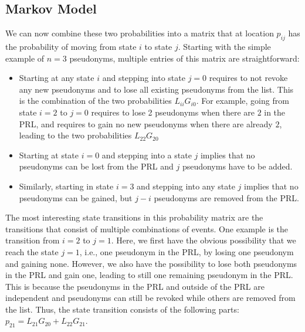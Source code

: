 \subsection{Markov Model}
We can now combine these two probabilities into a matrix that at location
$p_{ij}$ has the probability of moving from state $i$ to state $j$. Starting
with the simple example of $n=3$ pseudonyms, multiple entries of this matrix are
straightforward:
\begin{itemize}
    \item Starting at any state $i$ and stepping into state $j=0$ requires to not revoke any new pseudonyms and to lose all existing pseudonyms from the list. This is the combination of the two probabilities $L_{ii}G_{i0}$. For example, going from state $i=2$ to $j=0$ requires to lose 2 pseudonyms when there are $2$ in the \ac{PRL}, and requires to gain no new pseudonyms when there are already $2$, leading to the two probabilities $L_{22}G_{20}$
    \item Starting at state $i=0$ and stepping into a state $j$ implies that no pseudonyms can be lost from the \ac{PRL} and $j$ pseudonyms have to be added.
    \item Similarly, starting in state $i=3$ and stepping into any state $j$
    implies that no pseudonyms can be gained, but $j-i$ pseudonyms are removed
    from the \ac{PRL}.
\end{itemize}

The most interesting state transitions in this probability matrix are the
transitions that consist of multiple combinations of events. One example is the
transition from $i=2$ to $j=1$. Here, we first have the obvious possibility that
we reach the state $j=1$, i.e., one pseudonym in the \ac{PRL}, by losing one
pseudonym and gaining none. However, we also have the possibility to lose both
pseudonyms in the \ac{PRL} and gain one, leading to still one remaining
pseudonym in the \ac{PRL}. This is because the pseudonyms in the \ac{PRL} and
outside of the \ac{PRL} are independent and pseudonyms can still be revoked
while others are removed from the list. Thus, the state transition consists of
the following parts: $p_{21} = L_{21}G_{20} + L_{22}G_{21}$.

